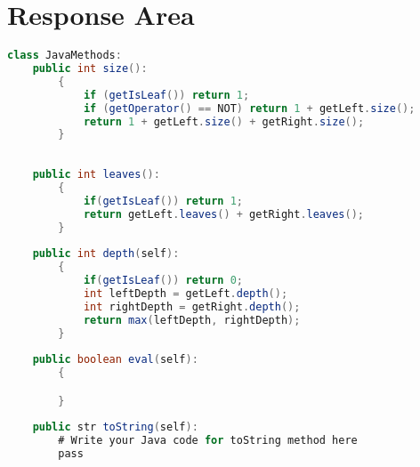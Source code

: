 \documentclass{article}
\begin{document}
\section*{Response Area}

\begin{lstlisting}[language=Java]
class JavaMethods:
    public int size():
        {
            if (getIsLeaf()) return 1;
            if (getOperator() == NOT) return 1 + getLeft.size();
            return 1 + getLeft.size() + getRight.size();
        }
        
    
    public int leaves():
        {
            if(getIsLeaf()) return 1;
            return getLeft.leaves() + getRight.leaves();
        }
    
    public int depth(self):
        {
            if(getIsLeaf()) return 0;
            int leftDepth = getLeft.depth();
            int rightDepth = getRight.depth();
            return max(leftDepth, rightDepth);
        }
    
    public boolean eval(self):
        {

        }
    
    public str toString(self):
        # Write your Java code for toString method here
        pass
\end{lstlisting}
\end{document}
